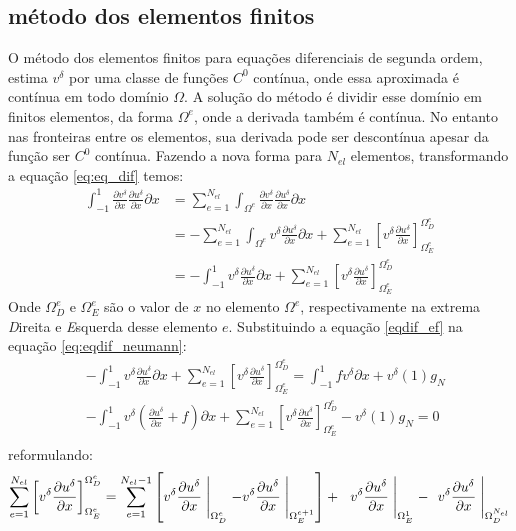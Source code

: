 \subsection{método dos elementos finitos}
 O método dos elementos finitos para equações diferenciais de segunda ordem, estima $v^\delta$ por uma classe de funções $C^0$ contínua, onde essa aproximada é contínua em todo domínio $\Omega$. A solução do método é dividir esse domínio em finitos elementos, da forma $\Omega^e$, onde a derivada também é contínua. No entanto nas fronteiras entre os elementos, sua derivada pode ser descontínua apesar da função ser $C^0$ contínua.
 Fazendo a nova forma para $N_{el}$ elementos, transformando a equação \eqref{eq:eq_dif} temos:
\begin{align} 
 \int^1_{-1} \frac{\partial v^\delta}{\partial x}\frac{\partial u^\delta}{\partial x} \partial x&= 
\sum^{N_{el}}_{e=1} \int_{\Omega^e}\frac{\partial v^\delta}{\partial x}\frac{\partial u^\delta}{\partial x} \partial x\\
& = - \sum^{N_{el}}_{e=1} \int_{\Omega^e} v^\delta\frac{\partial u^\delta}{\partial x} \partial x +\sum^{N_{el}}_{e=1} \left [ v^\delta \frac{\partial u^\delta}{\partial x}\right ]^{\Omega^e_D}_{\Omega^e_E}\\
& = -\int^1_{-1} v^\delta\frac{\partial u^\delta}{\partial x} \partial x +\sum^{N_{el}}_{e=1} \left [ v^\delta \frac{\partial u^\delta}{\partial x}\right ]^{\Omega^e_D}_{\Omega^e_E}\label{eqdif_ef}
\end{align}
 Onde $\Omega^e_D$ e $\Omega^e_E$ são o valor de $x$ no elemento  $\Omega^e$, respectivamente na extrema \emph{D}ireita e \emph{E}squerda desse elemento $e$. Substituindo a equação \eqref{eqdif_ef} na equação \eqref{eq:eqdif_neumann}:
 \begin{align}
& -\int^1_{-1} v^\delta\frac{\partial u^\delta}{\partial x} \partial x +\sum^{N_{el}}_{e=1} \left [ v^\delta \frac{\partial u^\delta}{\partial x}\right ]^{\Omega^e_D}_{\Omega^e_E} =\int^1_{-1} fv^\delta  \partial x + v^\delta(1)g_N \\
& -\int^1_{-1} v^\delta\left (\frac{\partial u^\delta}{\partial x} + f  \right ) \partial x +\sum^{N_{el}}_{e=1} \left [ v^\delta \frac{\partial u^\delta}{\partial x}\right ]^{\Omega^e_D}_{\Omega^e_E} -  v^\delta(1)g_N = 0 \\
 \end{align}
  reformulando:
\begin{equation}
\sum^{N_{el}}_{e=1} \left [ v^\delta \frac{\partial u^\delta}{\partial x}\right ]^{\Omega^e_D}_{\Omega^e_E} = \sum^{{N_{el} -1}}_{e=1} \left [ v^\delta \frac{\partial u^\delta}{\partial x}\Biggm\lvert_{\Omega^e_D} -  v^\delta \frac{\partial u^\delta}{\partial x}\Biggm\lvert_{\Omega^{e+ 1}_E}    \right ] +\ \    v^\delta \frac{\partial u^\delta}{\partial x}\Biggm\lvert_{\Omega^{1}_E} -\ \   v^\delta \frac{\partial u^\delta}{\partial x}\Biggm\lvert_{\Omega^{N_{el}}_D}
\end{equation}
